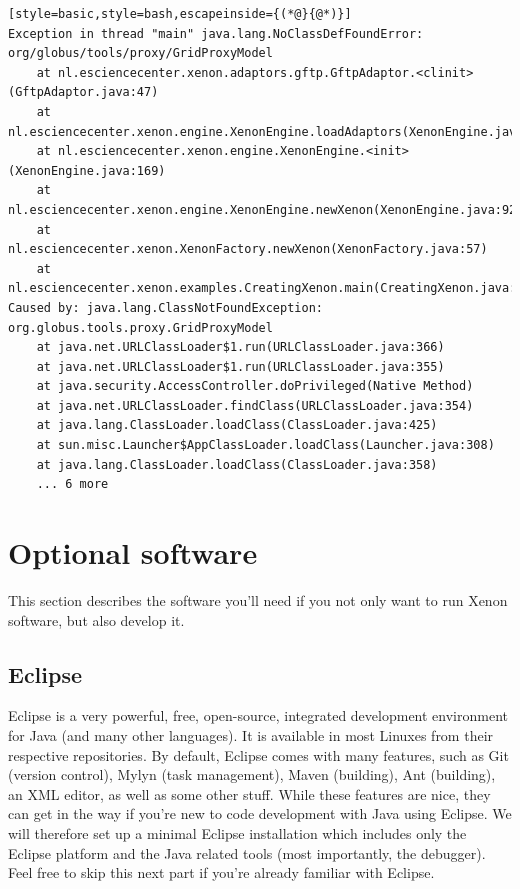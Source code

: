 \documentclass[12pt, a4paper, twoside,openany,titlepage]{article}
\begin{document}
{\begin{lstlisting}[style=basic,style=bash,escapeinside={(*@}{@*)}]
Exception in thread "main" java.lang.NoClassDefFoundError: org/globus/tools/proxy/GridProxyModel
    at nl.esciencecenter.xenon.adaptors.gftp.GftpAdaptor.<clinit>(GftpAdaptor.java:47)
    at nl.esciencecenter.xenon.engine.XenonEngine.loadAdaptors(XenonEngine.java:187)
    at nl.esciencecenter.xenon.engine.XenonEngine.<init>(XenonEngine.java:169)
    at nl.esciencecenter.xenon.engine.XenonEngine.newXenon(XenonEngine.java:92)
    at nl.esciencecenter.xenon.XenonFactory.newXenon(XenonFactory.java:57)
    at nl.esciencecenter.xenon.examples.CreatingXenon.main(CreatingXenon.java:39)
Caused by: java.lang.ClassNotFoundException: org.globus.tools.proxy.GridProxyModel
    at java.net.URLClassLoader$1.run(URLClassLoader.java:366)
    at java.net.URLClassLoader$1.run(URLClassLoader.java:355)
    at java.security.AccessController.doPrivileged(Native Method)
    at java.net.URLClassLoader.findClass(URLClassLoader.java:354)
    at java.lang.ClassLoader.loadClass(ClassLoader.java:425)
    at sun.misc.Launcher$AppClassLoader.loadClass(Launcher.java:308)
    at java.lang.ClassLoader.loadClass(ClassLoader.java:358)
    ... 6 more
\end{lstlisting} %

\section{Optional software}

This section describes the software you'll need if you not only want to run Xenon software, but also develop it.


\subsection{Eclipse}

Eclipse is a very powerful, free, open-source, integrated development environment for Java (and many other languages). It is available in most Linuxes from their respective repositories. By default, Eclipse comes with many features, such as Git (version control), Mylyn (task management), Maven (building), Ant (building), an XML editor, as well as some other stuff. While these features are nice, they can get in the way if you're new to code development with Java using Eclipse. We will therefore set up a minimal Eclipse installation which includes only the Eclipse platform and the Java related tools (most importantly, the debugger). Feel free to skip this next part if you're already familiar with Eclipse.

}
\end{document}
